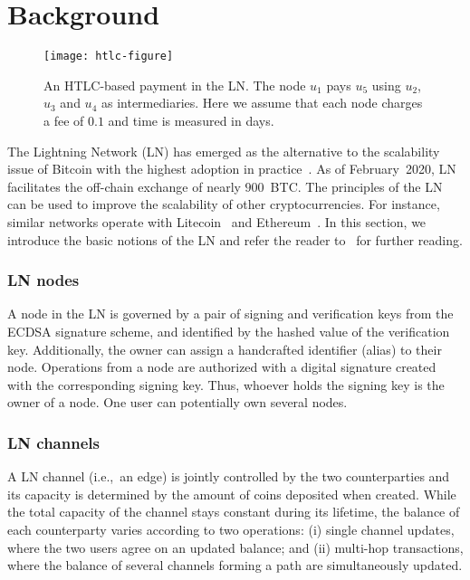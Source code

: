 \section{Background}
\label{sec:background}

\begin{figure*}[tb]
\texttt{[image: htlc-figure]}
	\caption{An HTLC-based payment in the LN. The node $u_1$ pays $u_5$ using $u_2$, $u_3$ and $u_4$ as intermediaries. 
	Here we assume that each node charges a fee of $0.1$ and time is measured in days.\label{fig:htlc}}
\end{figure*}

The Lightning Network (LN) has emerged as the alternative to the scalability issue of Bitcoin  with the highest adoption in practice~\cite{Cuen2019}.
As of February~2020, LN facilitates the off-chain exchange of nearly $900$~BTC.
The principles of the LN can be used to improve the scalability of other cryptocurrencies. 
For instance, similar networks operate with Litecoin~\cite{1MLLitecoin} and Ethereum~\cite{RaidenWebsite}. 
In this section, we introduce the basic notions of the LN and refer the reader 
to~\cite{Gudgeon2019} for further reading.

\subsubsection*{LN nodes} A node in the LN is governed by a pair of signing and verification keys from 
the ECDSA signature scheme, 
and identified by the hashed value of the verification key.  
Additionally, the owner can assign a handcrafted identifier (alias) to their node.
Operations from a node are authorized with a digital signature 
created with the corresponding signing key.
Thus, whoever holds the signing key is the owner of a node.
One user can potentially own several nodes.

\subsubsection*{LN channels} A LN channel (i.e.,~an edge) is jointly controlled by the two counterparties and its capacity is determined by the amount of coins 
deposited when created.
While the total capacity of the channel stays constant during its lifetime,
the balance of each counterparty varies according to two operations:
(i) single channel updates, where the two users agree on an updated balance; and 
(ii) multi-hop transactions, where the balance 
of several channels forming a path are simultaneously updated. 

